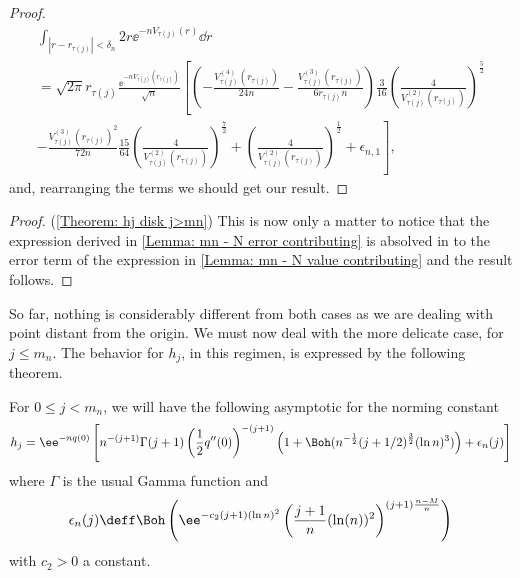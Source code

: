 \begin{proof}
\begin{multline}
		\int_{|r - r_{\tau(j)}| < \delta_n} 2 r \ee^{-n V_{\tau(j)}(r)} \dd r  \\ = \sqrt{2\pi} r_{\tau(j)} \frac{\ee^{-n V_{\tau(j)}(r_{\tau(j)})}}{\sqrt{n}} \left[
	\left(- \frac{V^{(4)}_{\tau(j)}(r_{\tau(j)})}{24 n} - \frac{V^{(3)}_{\tau(j)}(r_{\tau(j)})}{6 r_{\tau(j)} n} \right) \frac{3}{16} \left( \frac{4}{V^{(2)}_{\tau(j)}(r_{\tau(j)})} \right)^{\frac{5}{2}} \right. \\
	\left. - \frac{V^{(3)}_{\tau(j)}(r_{\tau(j)})^2}{72 n} \frac{15}{64} \left(\frac{4}{V^{(2)}_{\tau(j)}(r_{\tau(j)})} \right)^{\frac{7}{2}} +
	\left( \frac{4}{V^{(2)}_{\tau(j)}(r_{\tau(j)})} \right)^{\frac{1}{2}} + \epsilon_{n,1} \right],
\end{multline}
and, rearranging the terms we should get our result.
\end{proof}

\begin{proof} (\autoref{Theorem: hj disk j>mn})
	This is now only a matter to notice that the expression derived in \autoref{Lemma: mn - N error contributing} is absolved in to the error term of the expression in \autoref{Lemma: mn - N value contributing} and the result follows.
\end{proof}

So far, nothing is considerably different from both cases as we are dealing with point distant from the origin. We must now deal with the more delicate case, for $j \leq m_n$. The behavior for $h_j$, in this regimen, is expressed by the following theorem.

\begin{teorema}	\label{Theorem: hj disk j<mn}
	For $0 \leq j < m_n$, we will have the following asymptotic for the norming constant
	\begin{equation}
	 h_j =  \ee^{-n q(0)} \left[ n^{-(j+1)} \Gamma(j+1)\left(\frac{1}{2} q''(0)\right)^{-(j+1)} \left( 1 + \Boh(n^{-\frac{1}{2}} (j+1/2)^{\frac{3}{2}} (\ln n)^3) \right)+ \epsilon_n(j) \right]
	\end{equation}
	where $\Gamma$ is the usual Gamma function and 
	\begin{equation}
		\epsilon_n(j) \deff \Boh\left(\ee^{-c_2 (j + 1) (\ln n)^2}  \left(\frac{j+1}{n} (\ln(n))^2 \right)^{(j+1) \frac{n-M}{n}} \right)
	\end{equation}
	with $c_2 > 0$ a constant.
\end{teorema}

